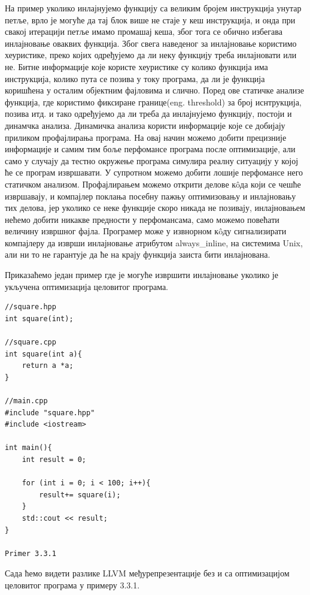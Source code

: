 \documentclass[12pt,oneside]{memoir}
\begin{document}
На пример уколико инлајнујемо функцију са великим бројем инструкција 
унутар петље, врло је могуће да тај блок више не стаје у кеш инструкција,
и онда при свакој итерацији петље имамо промашај кеша, због тога се
обично избегава инлајновање оваквих функција.
Због свега наведеног за инлајновање користимо хеуристике, преко којих одређујемо
да ли неку функцију треба инлајновати или не.
Битне информације које користе хеуристике су колико функција има инструкција,
колико пута се позива у току програма, да ли је функција коришћена у осталим
објектним фајловима и слично.
Поред ове статичке анализе функција, где користимо фиксиране границе(eng. threshold)
за број иснтрукција, позива итд. и тако одређујемо да ли треба да инлајнујемо функцију,
постоји и динамчка анализа.
Динамичка анализа користи информације које се добијају приликом профајлирања програма.
На овај начин можемо добити прецизније информације и самим тим боље перфомансе програма после оптимизације,
али само у случају да тестно окружење програма симулира реалну ситуацију у којој
ће се програм извршавати.
У супротном можемо добити лошије перфомансе него статичком анализом.
Профајлирањем можемо открити делове к\^{o}да који се чешће извршавају, и компајлер 
поклања посебну пажњу оптимизовању и инлајновању тих делова, јер уколико се неке
функције скоро никада не позивају, инлајновањем нећемо добити никакве предности
у перфомансама, само можемо повећати величину извршног фајла.	
Програмер може у извнорном  к\^{o}ду сигнализирати компајлеру да изврши инлајновање
атрибутом always{\_}inline, на системима Unix, али ни то не гарантује да ће на крају
функција заиста бити инлајнована.
\par
Приказаћемо један пример где је могуће извршити инлајновање уколико
је укључена оптимизација целовитог програма.

\begin{lstlisting}
//square.hpp           
int square(int);         
    					
//square.cpp				
int square(int a){
    return a *a;
}

//main.cpp
#include "square.hpp"
#include <iostream>

int main(){
    int result = 0;
    
    for (int i = 0; i < 100; i++){
        result+= square(i);
    }
    std::cout << result;
}

Primer 3.3.1
\end{lstlisting}

Сада ћемо видети разлике LLVM међурепрезентације без и са оптимизацијом
целовитог програма у примеру 3.3.1.
\end{document}
